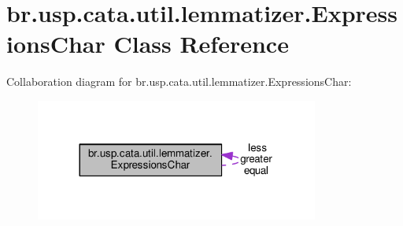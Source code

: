 \hypertarget{classbr_1_1usp_1_1cata_1_1util_1_1lemmatizer_1_1_expressions_char}{\section{br.\+usp.\+cata.\+util.\+lemmatizer.\+Expressions\+Char Class Reference}
\label{classbr_1_1usp_1_1cata_1_1util_1_1lemmatizer_1_1_expressions_char}
}


Collaboration diagram for br.\+usp.\+cata.\+util.\+lemmatizer.\+Expressions\+Char\+:\nopagebreak
\begin{figure}[H]
\begin{center}
\leavevmode
\includegraphics[width=264pt]{classbr_1_1usp_1_1cata_1_1util_1_1lemmatizer_1_1_expressions_char__coll__graph}
\end{center}
\end{figure}
